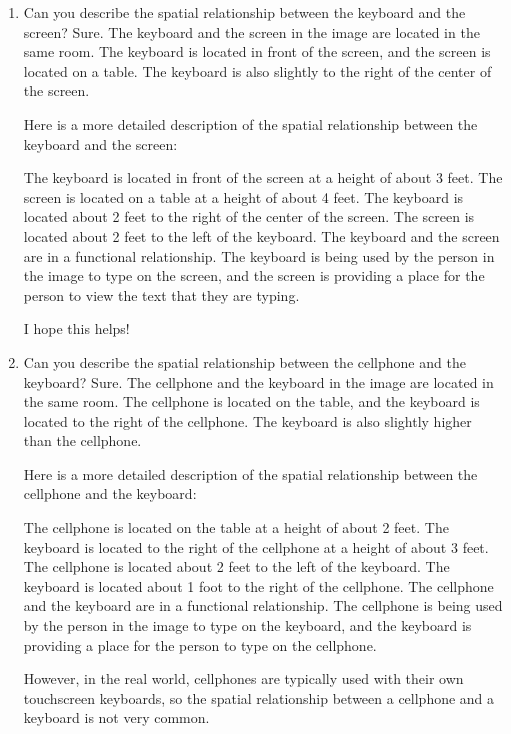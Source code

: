 \begin{enumerate}
    \item Can you describe the spatial relationship between the keyboard and the screen?
    \subitem Sure. The keyboard and the screen in the image are located in the same room. The keyboard is located in front of the screen, and the screen is located on a table. The keyboard is also slightly to the right of the center of the screen.

    Here is a more detailed description of the spatial relationship between the keyboard and the screen:
    
    The keyboard is located in front of the screen at a height of about 3 feet.
    The screen is located on a table at a height of about 4 feet.
    The keyboard is located about 2 feet to the right of the center of the screen.
    The screen is located about 2 feet to the left of the keyboard.
    The keyboard and the screen are in a functional relationship. The keyboard is being used by the person in the image to type on the screen, and the screen is providing a place for the person to view the text that they are typing.
    
    I hope this helps!
    \item Can you describe the spatial relationship between the cellphone and the keyboard?
    \subitem 
    Sure. The cellphone and the keyboard in the image are located in the same room. The cellphone is located on the table, and the keyboard is located to the right of the cellphone. The keyboard is also slightly higher than the cellphone.
    
    Here is a more detailed description of the spatial relationship between the cellphone and the keyboard:
    
    The cellphone is located on the table at a height of about 2 feet.
    The keyboard is located to the right of the cellphone at a height of about 3 feet.
    The cellphone is located about 2 feet to the left of the keyboard.
    The keyboard is located about 1 foot to the right of the cellphone.
    The cellphone and the keyboard are in a functional relationship. The cellphone is being used by the person in the image to type on the keyboard, and the keyboard is providing a place for the person to type on the cellphone.
    
    However, in the real world, cellphones are typically used with their own touchscreen keyboards, so the spatial relationship between a cellphone and a keyboard is not very common.
    

\end{enumerate}
